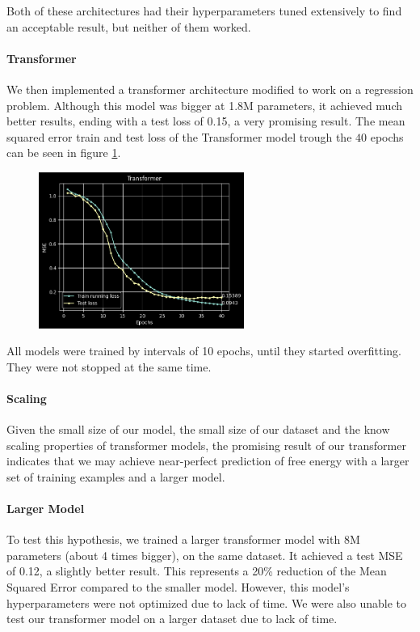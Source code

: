 \documentclass[11pt]{article}
\begin{document}
Both of these architectures had their hyperparameters tuned extensively to find an acceptable result, but neither of them worked.

\paragraph{Transformer} We then implemented a transformer architecture modified to work on a regression problem. Although this model was bigger at 1.8M parameters, it achieved much better results, ending with a test loss of 0.15, a very promising result. The  mean squared error train and test loss of the Transformer model trough the $40$ epochs can be seen in figure \ref{fig:transformer}.

\begin{figure}[H]
    \caption{}
    \centering
    \includegraphics[width=0.6\textwidth]{images/transformer.png}
    \label{fig:transformer}
\end{figure}


All models were trained by intervals of 10 epochs, until they started overfitting. They were not stopped at the same time. 

\paragraph{Scaling} Given the small size of our model, the small size of our dataset and the know scaling properties of transformer models, the promising result of our transformer indicates that we may achieve near-perfect prediction of free energy with a larger set of training examples and a larger model.

\paragraph{Larger Model} To test this hypothesis, we trained a larger transformer model with 8M parameters (about 4 times bigger), on the same dataset. It achieved a test MSE of 0.12, a slightly better result. This represents a 20\% reduction of the Mean Squared Error compared to the smaller model. However, this model's hyperparameters were not optimized due to lack of time. We were also unable to test our transformer model on a larger dataset due to lack of time.
\end{document}
